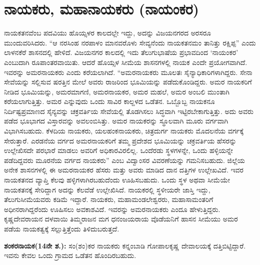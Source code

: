 \section*{ನಾಯಕರು, ಮಹಾನಾಯಕರು (ನಾಯಂಕರ)}

ನಾಯಕತನವೆಂಬ ಪದವಿಯು ಹೊಯ್ಸಳರ ಕಾಲದಲ್ಲೇ ಇದ್ದು, ಅದನ್ನು ವಿಜಯನಗರದ ಅರಸರೂ ಮುಂದುವರಿಸಿದರು. “ಆ ನರಸಿಂಹ ನರಪಾಳಂ ಮಾನವರೊಳು ಸೇವ್ಯನೆಂದು ನಾಯಕತನಮಂ ತಾನಿತ್ತು ರಕ್ಷಿಪ್ಪ” ಎಂದು ಲಾಳನಕೆರೆ ಶಾಸನದಲ್ಲಿ ಹೇಳಿದೆ. ವಿಜಯನಗರ ಕಾಲದಲ್ಲಿ ಇದು ತೆಲುಗುಭಾಷೆಯ ಪ್ರಭಾವದಿಂದ ‘ನಾಯಂಕರ’ ಎಂಬುದಾಗಿ ರೂಪಾಂತರ\-ವಾಯಿತು. ಆದರೆ ಹೊಯ್ಸಳ ಸೀಮೆಯ ಶಾಸನಗಳಲ್ಲಿ ನಾಯಕ ಎಂದೇ ಪ್ರಯೋಗವಾಗಿದೆ. ಇವರನ್ನು ಅಮರನಾಯಕರು ಎಂದು ಕರೆಯಲಾಗಿದೆ. “ಅಮರನಾಯಕರು ಮೂಲತಃ ಸೈನ್ಯಾಧಿಕಾರಿಗಳಾಗಿದ್ದರು. ಸೇನಾ ಸೇವೆಯನ್ನು ಸಲ್ಲಿಸುವ ಷರತ್ತಿನ ಮೇಲೆ ಅವರು ರಾಜರಿಂದ ಭೂಮಿಯನ್ನು ಪಡೆದುಕೊಂಡಿದ್ದರು. ಅಮರ ನಾಯಕರಿಗೆ ನೀಡಿದ ಭೂಮಿಯನ್ನು, ಅಮರಮಾಗಣಿ, ಅಮರನಾಯಕರ, ಅಮರ ಮಹಲೆ, ಅಮರ ಅಂಬಲಿ ಮುಂತಾಗಿ ಕರೆಯಲಾಗುತ್ತಿತ್ತು. ಅಮರ ಎನ್ನುವುದು ಒಂದು ಸಾವಿರ ಕಾಲ್ದಳದ ಒಡೆತನ. ಒಬ್ಬೊಬ್ಬ ನಾಯಕನೂ ನಿರ್ದಿಷ್ಟಪ್ರಮಾಣದ ಸೈನ್ಯವನ್ನು ಚಕ್ರವರ್ತಿಯ ಸೇವೆಯಲ್ಲಿ ತೊಡಗಿಸಲು ಸಿದ್ಧವಾಗಿ ಇಟ್ಟಿರಬೇಕಾಗುತ್ತಿತ್ತು. ಅದು ಅವರು ಪಡೆದ ಭೂಭಾಗದ ವಿಸ್ತಾರವನ್ನು ಅವಲಂಬಿಸಿತ್ತು. ಅಮರ ನಾಯಕರನ್ನು ಸ್ಥೂಲವಾಗಿ ಮೂರು ವರ್ಗವಾಗಿ ವಿಭಾಗಿಸಬಹುದು. ಕೆಳದಿಯ ನಾಯಕರು, ಯಲಹಂಕನಾಯಕರು, ಚಿತ್ರದುರ್ಗ ನಾಯಕರು ಮೊದಲನೆಯ ವರ್ಗಕ್ಕೆ ಸೇರುತ್ತಾರೆ. ಎರಡನೆಯ ವರ್ಗದ ಅಮರನಾಯಕರಿಗೆ ತಮ್ಮ ಪ್ರದೇಶದ ಭೂಮಿಯನ್ನು ಚಕ್ರವರ್ತಿಯ ಹೆಸರನ್ನು ಉಲ್ಲೇಖಿಸದೇ ಪರಭಾರೆ ಮಾಡಲು ಅವರಿಗೆ ಅಧಿಕಾರವಿರಲಿಲ್ಲ. ಒಂದೆರಡು ಸ್ಥಳಗಳನ್ನೇ, ಒಂದು ಹಳ್ಳಿಯನ್ನೇ ಪಡೆದಿದ್ದವರು ಮೂರನೆಯ ವರ್ಗದ ನಾಯಕರು” ಎಂಬ ವಿದ್ವಾಂಸರ ವಿವರಣೆಯನ್ನು ಗಮನಿಸಬಹುದು. ಜಿಲ್ಲೆಯ ಅನೇಕ ಶಾಸನಗಳಲ್ಲಿ ಈ ಅಮರನಾಯಕರ ಹೆಸರು ಮತ್ತು ಅವರು ಮಾಡಿದ ದಾನ ದತ್ತಿಗಳ ಉಲ್ಲೇಖವಿದೆ. ಇವರ ನಾಯಕತನದ ವ್ಯಾಪ್ತಿ ಕೆಲವು ಹಳ್ಳಿಗಳಾಗಿರಬಹುದೆಂದು ಊಹಿಸಬಹುದು. ಒಂದು ಸ್ಥಳ ಅಥವಾ ಸೀಮೆಯೇ ನಾಯಕತನಕ್ಕೆ ಸೇರಿದ್ದಾಗ ಅದನ್ನು ಕೆಲವೆಡೆ ಉಲ್ಲೇಖಿಸಿದೆ. ನಾಯಕರಲ್ಲಿ ಸ್ಥಳೀಯರೇ ಜಾಸ್ತಿ ಇದ್ದು, ತೆಲುಗುಸೀಮೆಯವರು ಕಡಿಮೆ ಇದ್ದಾರೆ. ನಾಯಕರು, ಮಹಾಮಂಡಲೇಶ್ವರರು, ಮಹಾಸಾಮಂತರಿಗೆ ಅಧೀನರಾಗಿದ್ದರೆಂದು ಊಹಿಸಲು ಅವಕಾಶವಿದೆ. ಇವರನ್ನು ಅಮರನಾಯಕರು ಎಂದೂ ಹೇಳುತ್ತಿದ್ದರು. ಕೃಷ್ಣದೇವರಾಯನ ದಳವಾಯಿ ತಿಮ್ಮರಾಜನ ಮಗ ಧನಂಜಯರಾಯ ವೊಡೆಯನಿಗೆ ಹಾಸನ ಸೀಮೆಯು ಅಮರ ಪಡೆಯ ನಾಯಕತ್ವಕ್ಕೆ ಸಲ್ಲುತ್ತಿತ್ತೆಂದು ತಿಳಿದುಬರುತ್ತದೆ.

\textbf{ಶಂಕರನಾಯಕ(14ನೇ ಶ.):} ಸಂ(ಶಂ)ಕರ ನಾಯಕರು ಕನ್ನಂಬಾಡಿ ಗೋಪಾಲಕೃಷ್ಣ ದೇವಾಲಯಕ್ಕೆ ದತ್ತಿ\break ಬಿಟ್ಟಿದ್ದಾರೆ. ಇವನು ಕೇವಲ ಒಂದು ಗ್ರಾಮದ ಒಡೆತನ ಹೊಂದಿರಬಹುದು.

